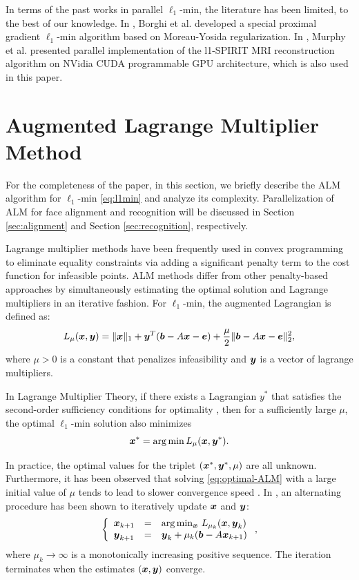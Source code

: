 \documentclass[10pt,twocolumn,letterpaper]{article}
\begin{document}
In terms of the past works in parallel $\ell_1$-min, the literature has been
limited, to the best of our knowledge. In \cite{BorghiA2010}, Borghi et al.
developed a special proximal gradient $\ell_1$-min algorithm based on
Moreau-Yosida regularization. In \cite{MurphyM2010}, Murphy et al. presented
parallel implementation of the l1-SPIRIT MRI reconstruction algorithm on NVidia
CUDA programmable GPU architecture, which is also used in this paper.

\section{Augmented Lagrange Multiplier Method}
\label{sec:ALM}

For the completeness of the paper, in this section, we briefly describe the ALM
algorithm for $\ell_1$-min \eqref{eq:l1min} \cite{YangA2010-ICIP} and analyze
its complexity. Parallelization of ALM for face alignment and recognition will
be discussed in Section \ref{sec:alignment} and Section \ref{sec:recognition},
respectively.

Lagrange multiplier methods have been frequently used in convex programming to
eliminate equality constraints via adding a significant penalty term to the
cost function for infeasible points. ALM methods differ from other
penalty-based approaches by simultaneously estimating the optimal solution and
Lagrange multipliers in an iterative fashion.  For $\ell_1$-min, the augmented
Lagrangian is defined as: \begin{equation} L_\mu({\boldsymbol{x}},{\boldsymbol{y}}) = \|{\boldsymbol{x}}\|_1 +
{\boldsymbol{y}}^T({\boldsymbol{b}} - A{\boldsymbol{x}} - {\boldsymbol{e}}) + \frac{\mu}{2} \| {\boldsymbol{b}}-A{\boldsymbol{x}}-{\boldsymbol{e}} \|_2^2, \end{equation}
where $\mu > 0$ is a constant that penalizes infeasibility and ${\boldsymbol{y}}$ is a
vector of lagrange multipliers.

In Lagrange Multiplier Theory, if there exists a Lagrangian $y^*$ that
satisfies the second-order sufficiency conditions for optimality
\cite{BertsekasD2003}, then for a sufficiently large $\mu$, the optimal
$\ell_1$-min solution also minimizes
\begin{equation}
{\boldsymbol{x}}^* = \arg \min L_\mu({\boldsymbol{x}},{\boldsymbol{y}}^*).
\label{eq:optimal-ALM}
\end{equation}

In practice, the optimal values for the triplet $({\boldsymbol{x}}^*, {\boldsymbol{y}}^*, \mu)$ are all
unknown. Furthermore, it has been observed that solving
\eqref{eq:optimal-ALM} with a large initial value of $\mu$ tends to lead to
slower convergence speed \cite{WrightS2008,YangA2010-ICIP}. In
\cite{BertsekasD2003,YangJ2009}, an alternating procedure has been shown to
iteratively update ${\boldsymbol{x}}$ and ${\boldsymbol{y}}$:
\begin{equation}
\left \{
\begin{array}{lll}
{\boldsymbol{x}}_{k+1} & = & \arg\min_{{\boldsymbol{x}}} \, L_{\mu_k} ({\boldsymbol{x}},{\boldsymbol{y}}_k)\\
{\boldsymbol{y}}_{k+1} & = & {\boldsymbol{y}}_k + \mu_k ({\boldsymbol{b}} - A{\boldsymbol{x}}_{k+1}) \\
\end{array}
\right . ,
\label{eq:alm}
\end{equation}
where $\mu_{k}\rightarrow \infty$ is a monotonically increasing positive sequence.
The iteration terminates when the estimates $({\boldsymbol{x}}, {\boldsymbol{y}})$ converge.
\end{document}
